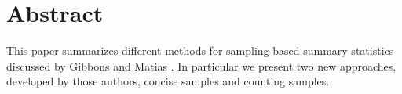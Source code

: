 \section{Abstract}

This paper summarizes different methods for sampling based summary
statistics discussed by Gibbons and Matias
\cite{GM98}. In particular we present two new approaches, developed by
those authors, concise samples and counting samples.

